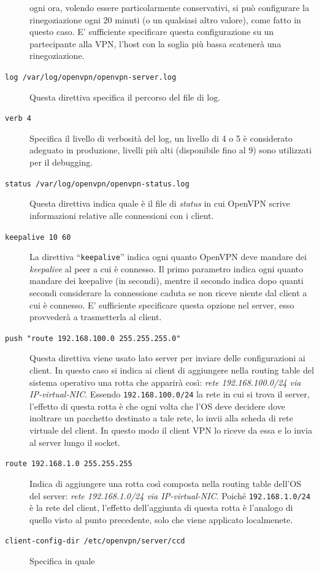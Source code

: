 \begin{description}
	ogni ora, volendo essere particolarmente conservativi, si può configurare
	la rinegoziazione ogni 20 minuti (o un qualsiasi altro valore), come fatto in
	questo caso. E' sufficiente specificare questa configurazione su un partecipante
	alla VPN, l'host con la soglia più bassa scatenerà una rinegoziazione.
	\item[\texttt{log /var/log/openvpn/openvpn-server.log}]Questa direttiva specifica
	il percorso del file di log.
	\item[\texttt{verb 4}]Specifica il livello di verbosità del log, un livello di
	4 o 5 è considerato adeguato in produzione, livelli più alti (disponibile fino al 9)
	sono utilizzati per il debugging.
	\item[\texttt{status /var/log/openvpn/openvpn-status.log}]Questa direttiva indica
	quale è il file di \textit{status} in cui OpenVPN scrive informazioni relative
	alle connessioni con i client.
	\item[\texttt{keepalive 10 60}]La direttiva ``\texttt{keepalive}'' indica ogni
	quanto OpenVPN deve mandare dei \textit{keepalive} al peer a cui è connesso.
	Il primo parametro indica ogni quanto mandare dei keepalive (in secondi), mentre
	il secondo indica dopo quanti secondi considerare la connessione caduta se non riceve
	niente dal client a cui è connesso. E' sufficiente specificare questa opzione
	nel server, esso provvederà a trasmetterla al client.
	\item[\texttt{push "route 192.168.100.0 255.255.255.0"}]Questa direttiva viene
	usato lato server per inviare delle configurazioni ai client. In questo caso si indica
	ai client di aggiungere nella routing table del sistema operativo una rotta che
	apparirà così: \textit{rete 192.168.100.0/24 via IP-virtual-NIC}. Essendo
	\texttt{192.168.100.0/24} la rete in cui si trova il server, l'effetto di questa
	rotta è che ogni volta che l'OS deve decidere dove inoltrare un
	pacchetto destinato a tale rete, lo invii alla scheda di rete virtuale
	del client. In questo modo il client VPN lo riceve da essa e lo invia al server
	lungo il socket.
	\item[\texttt{route 192.168.1.0 255.255.255}]Indica di aggiungere una rotta
	così composta nella routing table dell'OS del server: \textit{rete 192.168.1.0/24
		via IP-virtual-NIC}. Poiché \texttt{192.168.1.0/24} è la rete del client, l'effetto
	dell'aggiunta di questa rotta è l'analogo di quello visto al punto precedente, solo che
	viene applicato localmenete.
	\item[\texttt{client-config-dir /etc/openvpn/server/ccd}]Specifica in quale

\end{description}
